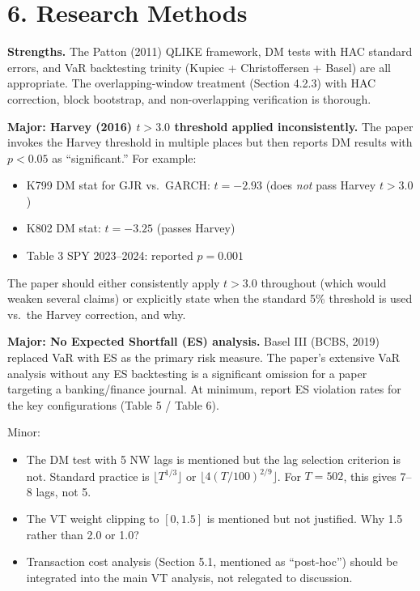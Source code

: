 \documentclass[12pt,a4paper]{article}
\begin{document}
\bigskip

\section*{6. Research Methods}

\textcolor{okgreen}{\textbf{Strengths.}} The Patton (2011) QLIKE framework, DM tests with HAC standard errors, and VaR backtesting trinity (Kupiec + Christoffersen + Basel) are all appropriate. The overlapping-window treatment (Section 4.2.3) with HAC correction, block bootstrap, and non-overlapping verification is thorough.

\textcolor{warncolor}{\textbf{Major: Harvey (2016) $t > 3.0$ threshold applied inconsistently.}} The paper invokes the Harvey threshold in multiple places but then reports DM results with $p < 0.05$ as ``significant.'' For example:
\begin{itemize}[nosep]
\item K799 DM stat for GJR vs.\ GARCH: $t = -2.93$ (does \textit{not} pass Harvey $t > 3.0$)
\item K802 DM stat: $t = -3.25$ (passes Harvey)
\item Table 3 SPY 2023--2024: reported $p = 0.001$
\end{itemize}
The paper should either consistently apply $t > 3.0$ throughout (which would weaken several claims) or explicitly state when the standard 5\% threshold is used vs.\ the Harvey correction, and why.

\textcolor{warncolor}{\textbf{Major: No Expected Shortfall (ES) analysis.}} Basel III (BCBS, 2019) replaced VaR with ES as the primary risk measure. The paper's extensive VaR analysis without any ES backtesting is a significant omission for a paper targeting a banking/finance journal. At minimum, report ES violation rates for the key configurations (Table 5 / Table 6).

Minor:
\begin{itemize}[nosep]
\item The DM test with 5 NW lags is mentioned but the lag selection criterion is not. Standard practice is $\lfloor T^{1/3} \rfloor$ or $\lfloor 4(T/100)^{2/9} \rfloor$. For $T = 502$, this gives 7--8 lags, not 5.
\item The VT weight clipping to $[0, 1.5]$ is mentioned but not justified. Why 1.5 rather than 2.0 or 1.0?
\item Transaction cost analysis (Section 5.1, mentioned as ``post-hoc'') should be integrated into the main VT analysis, not relegated to discussion.
\end{itemize}
\end{document}
